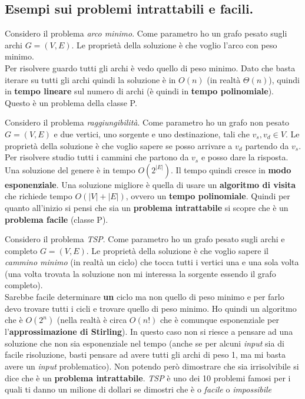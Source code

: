 \subsection{Esempi sui problemi intrattabili e facili.}
\begin{esempio}
	Considero il problema \emph{arco minimo}. Come parametro ho un grafo pesato
	sugli archi $G=(V,E)$. Le proprietà della soluzione è che voglio l'arco con
	peso minimo.\\
	Per risolvere guardo tutti gli archi è vedo quello di peso minimo. Dato che
	basta iterare su tutti gli archi quindi la soluzione è in $O(n)$ (in realtà
	$\Theta(n)$), quindi in \textbf{tempo lineare} sul numero di archi (è quindi
	in \textbf{tempo polinomiale}). Questo è un problema della classe P.
\end{esempio}
\begin{esempio}
	Considero il problema \emph{raggiungibilità}. Come parametro ho un grafo non
	pesato $G=(V,E)$ e due vertici, uno sorgente e uno destinazione, tali che
	$v_s,v_d\in V$. Le proprietà della soluzione è che voglio sapere se posso
	arrivare a $v_d$ partendo da $v_s$.\\
	Per risolvere studio tutti i cammini che partono da $v_s$ e posso dare la
	risposta. Una soluzione del genere è in tempo $O(2^{|E|})$. Il tempo quindi
	cresce in \textbf{modo esponenziale}. Una soluzione migliore è quella di usare
	un \textbf{algoritmo di visita} che richiede tempo $O(|V|+|E|)$, ovvero un
	\textbf{tempo polinomiale}. Quindi per quanto all'inizio si pensi
	che sia un \textbf{problema intrattabile} si scopre che è un \textbf{problema
	facile} (classe P).
\end{esempio}
\begin{esempio}
	Considero il problema \emph{TSP}. Come parametro ho un grafo pesato sugli
	archi e completo $G=(V,E)$. Le proprietà della soluzione è che voglio sapere
	il \emph{cammino minimo} (in realtà un ciclo) che tocca tutti i vertici una e
	una sola volta (una volta trovata la soluzione non mi interessa la sorgente
	essendo il grafo completo). \\
	Sarebbe facile determinare \textbf{un} ciclo ma non quello di peso minimo e
	per farlo devo trovare tutti i cicli e trovare quello di peso minimo. Ho
	quindi un algoritmo che è $O(2^n)$ (nella realtà è circa $O(n!)$ che è
	comunque esponenziale per l'\textbf{approssimazione di Stirling}). In questo
	caso non si riesce a pensare ad una soluzione che non sia esponenziale nel
	tempo (anche se per alcuni \textit{input} sia di facile risoluzione, basti pensare ad
	avere tutti gli archi di peso 1, ma mi basta avere un \textit{input} problematico). Non
	potendo però dimostrare che sia irrisolvibile si dice che è un
	\textbf{problema intrattabile}. \textit{TSP} è uno dei 10 problemi famosi per
	i quali ti danno un milione di dollari se dimostri che è o \emph{facile} o
	\emph{impossibile}
\end{esempio}

